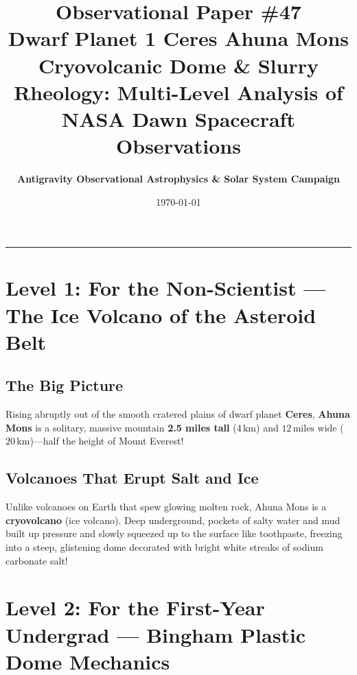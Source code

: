 \documentclass[11pt,a4paper]{article}
\title{\Huge \textbf{Observational Paper \#47}\\ \Large Dwarf Planet 1 Ceres Ahuna Mons Cryovolcanic Dome \& Slurry Rheology: Multi-Level Analysis of NASA Dawn Spacecraft Observations}
\author{\textbf{Antigravity Observational Astrophysics \& Solar System Campaign}}
\date{\today}
\begin{document}
\maketitle

\vspace{-1em}
\begin{center}
\rule{\textwidth}{1.5pt}
\end{center}

\section*{Level 1: For the Non-Scientist — The Ice Volcano of the Asteroid Belt}

\subsection*{The Big Picture}
Rising abruptly out of the smooth cratered plains of dwarf planet \textbf{Ceres}, \textbf{Ahuna Mons} is a solitary, massive mountain \textbf{2.5 miles tall} ($4\,\text{km}$) and $12\,\text{miles wide}$ ($20\,\text{km}$)—half the height of Mount Everest!

\subsection*{Volcanoes That Erupt Salt and Ice}
Unlike volcanoes on Earth that spew glowing molten rock, Ahuna Mons is a \textbf{cryovolcano} (ice volcano). Deep underground, pockets of salty water and mud built up pressure and slowly squeezed up to the surface like toothpaste, freezing into a steep, glistening dome decorated with bright white streaks of sodium carbonate salt!

\newpage

\section*{Level 2: For the First-Year Undergrad — Bingham Plastic Dome Mechanics}
\end{document}
